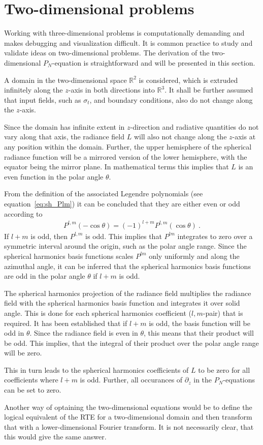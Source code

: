 \section{Two-dimensional problems}
\label{sec:pn_2d}

Working with three-dimensional problems is computationally demanding and makes debugging and visualization difficult. It is common practice to study and validate ideas on two-dimensional problems. The derivation of the two-dimensional $P_N$-equation is straightforward and will be presented in this section.

A domain in the two-dimensional space $\mathbb{R}^2$ is considered, which is extruded infinitely along the $z$-axis in both directions into $\mathbb{R}^3$. It shall be further assumed that input fields, such as $\sigma_t$, and boundary conditions, also do not change along the $z$-axis.

Since the domain has infinite extent in $z$-direction and radiative quantities do not vary along that axis, the radiance field $L$ will also not change along the $z$-axis at any position within the domain. Further, the upper hemisphere of the spherical radiance function will be a mirrored version of the lower hemisphere, with the equator being the mirror plane. In mathematical terms this implies that $L$ is an even function in the polar angle $\theta$.

From the definition of the associated Legendre polynomials (see equation~\ref{eq:sh_Plm}) it can be concluded that they are either even or odd according to
\begin{align}
P^{l,m}\left(-\operatorname{cos}\theta\right) = 
\left(-1\right)^{l+m}
P^{l,m}\left(\operatorname{cos}\theta\right)
\ .
\end{align}
If $l+m$ is odd, then $P^{l,m}$ is odd. This implies that $P^{lm}$ integrates to zero over a symmetric interval around the origin, such as the polar angle range. Since the spherical harmonics basis functions scales $P^{lm}$ only uniformly and along the azimuthal angle, it can be inferred that the spherical harmonics basis functions are odd in the polar angle $\theta$ if $l+m$ is odd.

The spherical harmonics projection of the radiance field multiplies the radiance field with the spherical harmonics basis function and integrates it over solid angle. This is done for each spherical harmonics coefficient ($l,m$-pair) that is required. It has been established that if $l+m$ is odd, the basis function will be odd in $\theta$. Since the radiance field is even in $\theta$, this means that their product will be odd. This implies, that the integral of their product over the polar angle range will be zero.

This in turn leads to the spherical harmonics coefficients of $L$ to be zero for all coefficients where $l+m$ is odd. Further, all occurances of $\partial_z$ in the $P_N$-equations can be set to zero.

Another way of optaining the two-dimensional equations would be to define the logical equivalent of the RTE for a two-dimensional domain and then transform that with a lower-dimensional Fourier transform. It is not necessarily clear, that this would give the same answer.
